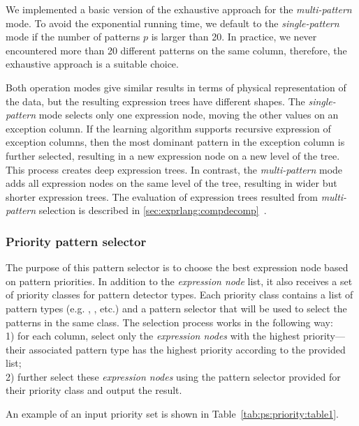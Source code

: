 We implemented a basic version of the exhaustive approach for the \textit{multi-pattern} mode. To avoid the exponential running time, we default to the \textit{single-pattern} mode if the number of patterns \(p\) is larger than 20. In practice, we never encountered more than 20 different patterns on the same column, therefore, the exhaustive approach is a suitable choice.

Both operation modes give similar results in terms of physical representation of the data, but the resulting expression trees have different shapes. The \textit{single-pattern} mode selects only one expression node, moving the other values on an exception column. If the learning algorithm supports recursive expression of exception columns, then the most dominant pattern in the exception column is further selected, resulting in a new expression node on a new level of the tree. This process creates deep expression trees. In contrast, the \textit{multi-pattern} mode adds all expression nodes on the same level of the tree, resulting in wider but shorter expression trees. The evaluation of expression trees resulted from \textit{multi-pattern} selection is described in \ref{sec:exprlang:compdecomp}~.

\subsubsection{Priority pattern selector}
\label{subsubsec:ps:priority}

The purpose of this pattern selector is to choose the best expression node based on pattern priorities. In addition to the \textit{expression node} list, it also receives a set of priority classes for pattern detector types. Each priority class contains a list of pattern types (e.g. , , etc.) and a pattern selector that will be used to select the patterns in the same class. The selection process works in the following way:\\
1) for each column, select only the \textit{expression nodes} with the highest priority---their associated pattern type has the highest priority according to the provided list;\\
2) further select these \textit{expression nodes} using the pattern selector provided for their priority class and output the result.

An example of an input priority set is shown in Table~\ref{tab:ps:priority:table1}.


